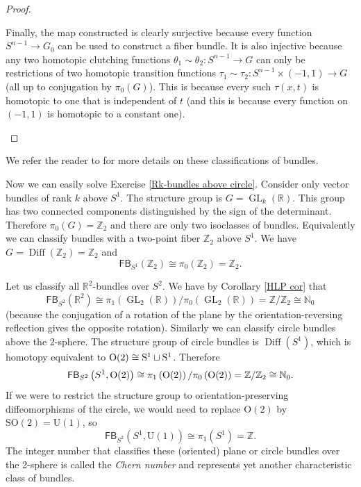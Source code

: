 \documentclass[english,letterpaper]{article}%
\numberwithin{equation}{section}
\numberwithin{figure}{section}
\numberwithin{table}{section}
\theoremstyle{definition}
\theoremstyle{definition}
\theoremstyle{definition}
\theoremstyle{plain}
\theoremstyle{plain}
\theoremstyle{plain}
\theoremstyle{plain}
\theoremstyle{remark}
\theoremstyle{remark}
\DeclareMathOperator{\Diff}{Diff}
\DeclareMathOperator{\GL}{GL}
\begin{document}
\begin{proof}
\begin{enumerate}
    Finally, the map constructed is clearly surjective because every function $S^{n-1}\to G_0$ can be used to construct a fiber bundle. It is also injective because any two homotopic clutching functions $\theta_1\sim\theta_2:S^{n-1}\to G$ can only be restrictions of two homotopic transition functions $\tau_1\sim\tau_2:S^{n-1}\times(-1,1)\to G$ (all up to conjugation by $\pi_0(G)$). This is because every such $\tau(x,t)$ is homotopic to one that is independent of $t$ (and this is because every function on $(-1,1)$ is homotopic to a constant one).
\end{enumerate}
\end{proof}

We refer the reader to \cite{HatcherVB} for more details on these classifications of bundles.

\begin{example}
Now we can easily solve Exercise \ref{Rk-bundles above circle}. Consider only vector bundles of rank $k$ above $S^1$. The structure group is $G=\GL_k(\mathbb{R})$. This group has two connected components distinguished by the sign of the determinant. Therefore $\pi_0(G)=\mathbb{Z}_2$ and there are only two isoclasses of bundles. Equivalently we can classify bundles with a two-point fiber $\mathbb{Z}_2$ above $S^1$. We have $G=\Diff(\mathbb{Z}_2)=\mathbb{Z}_2$ and
\[
    \mathsf{FB}_{S^1}(\mathbb{Z}_2)\cong \pi_{0}\left(\mathbb{Z}_2\right)=\mathbb{Z}_2.
\]
\end{example}
\begin{example}
Let us classify all $\mathbb{R}^2$-bundles over $S^2$. We have by Corollary \ref{HLP cor} that 
\[
    \mathsf{FB}_{S^2}(\mathbb{R}^2)\cong \pi_{1}\left(\GL_2(\mathbb{R})\right)/\pi_0\left(\GL_2(\mathbb{R})\right)=\mathbb{Z}/\mathbb{Z}_2\cong \mathbb{N}_0
\]
(because the conjugation of a rotation of the plane by the orientation-reversing reflection gives the opposite rotation). Similarly we can classify circle bundles above the 2-sphere. The structure group of circle bundles is $\Diff(S^1)$, which is homotopy equivalent to $\rm{O}(2)\cong S^1\sqcup S^1$. Therefore
\[
    \mathsf{FB}_{S^2}\left(S^1,\rm{O}(2)\right)\cong \pi_{1}\left(\rm{O}(2)\right)/\pi_0\left(\rm{O}(2)\right)=\mathbb{Z}/\mathbb{Z}_2\cong\mathbb{N}_0.
\]
If we were to restrict the structure group to orientation-preserving diffeomorphisms of the circle, we would need to replace $\mathrm{O}(2)$ by $\mathrm{SO}(2)=\mathrm{U}(1)$, so 
\[
    \mathsf{FB}_{S^2}(S^1,\mathrm{U}(1))\cong \pi_{1}\left(S^1\right)=\mathbb{Z}.
\]
The integer number that classifies these (oriented) plane or circle bundles over the 2-sphere is called the \emph{Chern number} and represents yet another characteristic class of bundles.
\end{example}
\end{document}
